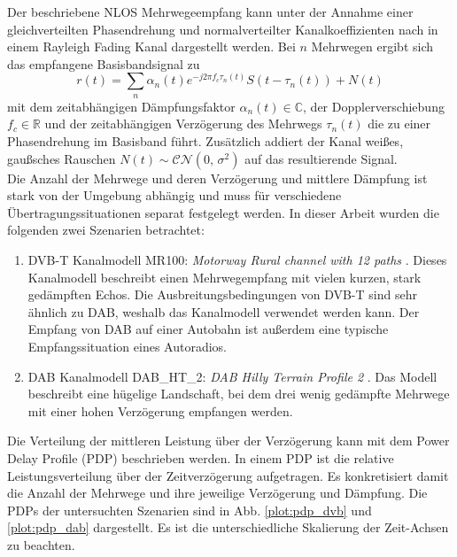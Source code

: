 Der beschriebene NLOS Mehrwegeempfang kann unter der Annahme einer gleichverteilten Phasendrehung und normalverteilter Kanalkoeffizienten nach \cite{proakis} in einem Rayleigh Fading Kanal dargestellt werden.
Bei $n$ Mehrwegen ergibt sich das empfangene Basisbandsignal zu
\begin{equation}
r(t) = \sum \limits_n \alpha_n(t) e^{-j2\pi f_c \tau_n(t)} S(t-\tau_n(t)) + N(t)
\end{equation}
mit dem zeitabhängigen Dämpfungsfaktor $\alpha_n(t) \in \mathbb{C}$, der Dopplerverschiebung $f_c \in \mathbb{R}$ und der zeitabhängigen Verzögerung des Mehrwegs $\tau_n(t)$ die zu einer Phasendrehung im Basisband führt. Zusätzlich addiert der Kanal weißes, gaußsches Rauschen $N(t) \sim \mathcal{C}\mathcal{N}(0,\,\sigma^{2})$ auf das resultierende Signal.\\  
Die Anzahl der Mehrwege und deren Verzögerung und mittlere Dämpfung ist stark von der Umgebung abhängig und muss für verschiedene Übertragungssituationen separat festgelegt werden.
In dieser Arbeit wurden die folgenden zwei Szenarien betrachtet:
\begin{enumerate}
\item DVB-T Kanalmodell MR100: \textit{Motorway Rural channel with 12 paths} \cite{kanalmodell:dvb_paper} \cite{etsi:dvb}. Dieses Kanalmodell beschreibt einen Mehrwegempfang mit vielen kurzen, stark gedämpften Echos. Die Ausbreitungsbedingungen von DVB-T sind sehr ähnlich zu DAB, weshalb das Kanalmodell verwendet werden kann. Der Empfang von DAB auf einer Autobahn ist außerdem eine typische Empfangssituation eines Autoradios.
\item DAB Kanalmodell DAB\_HT\_2: \textit{DAB Hilly Terrain Profile 2} \cite{kanalmodell:dab_ht_2}. Das Modell beschreibt eine hügelige Landschaft, bei dem drei wenig gedämpfte Mehrwege mit einer hohen Verzögerung empfangen werden.
\end{enumerate}
Die Verteilung der mittleren Leistung über der Verzögerung kann mit dem Power Delay Profile (PDP) beschrieben werden. In einem PDP ist die relative Leistungsverteilung über der Zeitverzögerung aufgetragen. Es konkretisiert damit die Anzahl der Mehrwege und ihre jeweilige Verzögerung und Dämpfung. Die PDPs der untersuchten Szenarien sind in Abb. \ref{plot:pdp_dvb} und \ref{plot:pdp_dab} dargestellt. Es ist die unterschiedliche Skalierung der Zeit-Achsen zu beachten.

